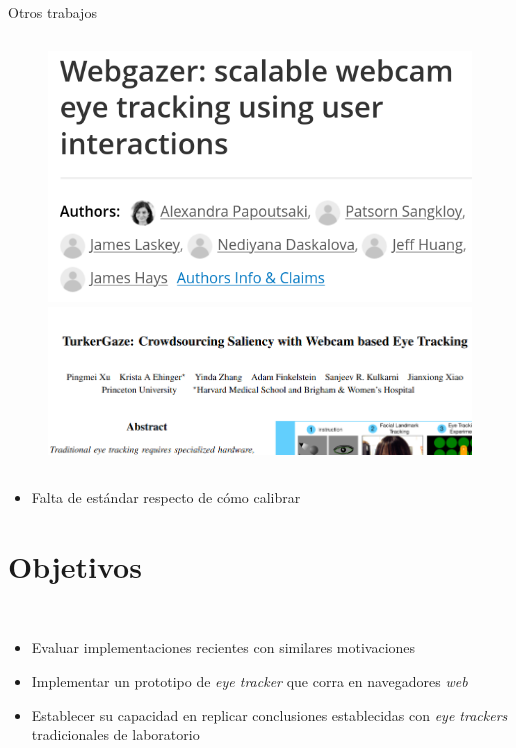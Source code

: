 \documentclass[aspectratio=169]{beamer}
\begin{document}
\begin{frame}{Otros trabajos}
\begin{columns}
    \begin{column}{0.5\textwidth}
      \begin{figure}
        \centering
        \includegraphics[width=0.7\linewidth]{img/webgazer.png}
        \includegraphics[width=\linewidth]{img/turker-gaze.png}
      \end{figure}
    \end{column}
  \end{columns}
  \begin{itemize}
    \item[\emoji{thumbs-down}] Falta de estándar respecto de cómo calibrar
  \end{itemize}
\end{frame}

\section{Objetivos}

\begin{frame}{~}

  \begin{itemize}
    \item Evaluar implementaciones recientes con similares motivaciones
    \item Implementar un prototipo de \textit{eye tracker} que corra en
      navegadores \textit{web}
    \item Establecer su capacidad en replicar conclusiones establecidas con
      \textit{eye trackers} tradicionales de laboratorio
  \end{itemize}
\end{frame}
\end{document}
